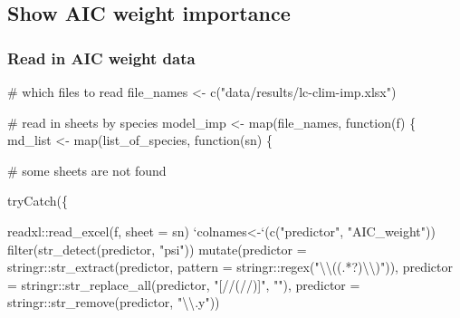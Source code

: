 \documentclass[]{article}
\newenvironment{Shaded}{}{}
\newcommand{\CharTok}[1]{\textcolor[rgb]{0.00,0.50,0.50}{#1}}
\newcommand{\CommentTok}[1]{\textcolor[rgb]{0.00,0.50,0.00}{#1}}
\newcommand{\ControlFlowTok}[1]{\textcolor[rgb]{0.00,0.00,1.00}{#1}}
\newcommand{\DataTypeTok}[1]{#1}
\newcommand{\KeywordTok}[1]{\textcolor[rgb]{0.00,0.00,1.00}{#1}}
\newcommand{\NormalTok}[1]{#1}
\newcommand{\OperatorTok}[1]{#1}
\newcommand{\StringTok}[1]{\textcolor[rgb]{0.00,0.50,0.50}{#1}}
\begin{document}
\hypertarget{show-aic-weight-importance}{%
\subsection{Show AIC weight importance}\label{show-aic-weight-importance}}

\hypertarget{read-in-aic-weight-data}{%
\subsubsection{Read in AIC weight data}\label{read-in-aic-weight-data}}

\begin{Shaded}
\begin{Highlighting}[]
\CommentTok{# which files to read}
\NormalTok{file_names <-}\StringTok{ }\KeywordTok{c}\NormalTok{(}\StringTok{"data/results/lc-clim-imp.xlsx"}\NormalTok{)}

\CommentTok{# read in sheets by species}
\NormalTok{model_imp <-}\StringTok{ }\KeywordTok{map}\NormalTok{(file_names, }\ControlFlowTok{function}\NormalTok{(f) \{}
\NormalTok{  md_list <-}\StringTok{ }\KeywordTok{map}\NormalTok{(list_of_species, }\ControlFlowTok{function}\NormalTok{(sn) \{}
    
    \CommentTok{# some sheets are not found}
    
    \KeywordTok{tryCatch}\NormalTok{(\{}
      
\NormalTok{      readxl}\OperatorTok{::}\KeywordTok{read_excel}\NormalTok{(f, }\DataTypeTok{sheet =}\NormalTok{ sn) }\OperatorTok{%
\StringTok{        `}\DataTypeTok{colnames<-}\StringTok{`}\NormalTok{(}\KeywordTok{c}\NormalTok{(}\StringTok{"predictor"}\NormalTok{, }\StringTok{"AIC_weight"}\NormalTok{)) }\OperatorTok{%
\StringTok{        }\KeywordTok{filter}\NormalTok{(}\KeywordTok{str_detect}\NormalTok{(predictor, }\StringTok{"psi"}\NormalTok{)) }\OperatorTok{%
\StringTok{        }\KeywordTok{mutate}\NormalTok{(}\DataTypeTok{predictor =}\NormalTok{ stringr}\OperatorTok{::}\KeywordTok{str_extract}\NormalTok{(predictor, }
                                \DataTypeTok{pattern =}\NormalTok{ stringr}\OperatorTok{::}\KeywordTok{regex}\NormalTok{(}\StringTok{"}\CharTok{\textbackslash{}\textbackslash{}}\StringTok{((.*?)}\CharTok{\textbackslash{}\textbackslash{}}\StringTok{)"}\NormalTok{)),}
               \DataTypeTok{predictor =}\NormalTok{ stringr}\OperatorTok{::}\KeywordTok{str_replace_all}\NormalTok{(predictor, }\StringTok{"[//(//)]"}\NormalTok{, }\StringTok{""}\NormalTok{),}
               \DataTypeTok{predictor =}\NormalTok{ stringr}\OperatorTok{::}\KeywordTok{str_remove}\NormalTok{(predictor, }\StringTok{"}\CharTok{\textbackslash{}\textbackslash{}}\StringTok{.y"}\NormalTok{))}
      
}}}
\end{Highlighting}
\end{Shaded}
\end{document}
